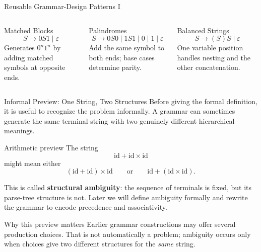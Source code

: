 \documentclass[10pt]{beamer}
\begin{document}
\begin{frame}{Reusable Grammar-Design Patterns I}
  \begin{columns}[T]
    \begin{block}{Matched Blocks}
      \[
        S\to0S1\mid\varepsilon
      \]
      Generates $0^n1^n$ by adding matched symbols at opposite ends.
    \end{block}

    \begin{block}{Palindromes}
      \[
        S\to0S0\mid1S1\mid0\mid1\mid\varepsilon
      \]
      Add the same symbol to both ends; base cases determine parity.
    \end{block}

    \begin{block}{Balanced Strings}
      \[
        S\to(S)S\mid\varepsilon
      \]
      One variable position handles nesting and the other concatenation.
    \end{block}
  \end{columns}
\end{frame}

\begin{frame}{Informal Preview: One String, Two Structures}
  \small
  Before giving the formal definition, it is useful to recognize the problem
  informally. A grammar can sometimes generate the same terminal string with
  two genuinely different hierarchical meanings.
  \pause
  \begin{exampleblock}{Arithmetic preview}
    The string
    \[
      \mathrm{id}+\mathrm{id}\times\mathrm{id}
    \]
    might mean either
    \[
      (\mathrm{id}+\mathrm{id})\times\mathrm{id}
      \qquad\text{or}\qquad
      \mathrm{id}+(\mathrm{id}\times\mathrm{id}).
    \]
  \end{exampleblock}
  \pause
  This is called \textbf{structural ambiguity}: the sequence of terminals is
  fixed, but its parse-tree structure is not. Later we will define ambiguity
  formally and rewrite the grammar to encode precedence and associativity.
  \begin{alertblock}{Why this preview matters}
    Earlier grammar constructions may offer several production choices. That
    is not automatically a problem; ambiguity occurs only when choices give
    two different structures for the \emph{same} string.
  \end{alertblock}
\end{frame}
\end{document}
